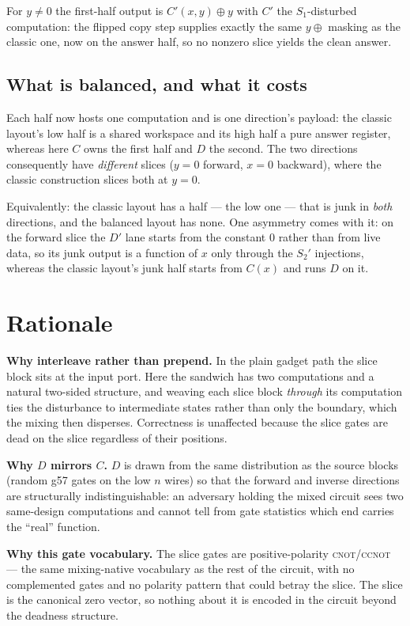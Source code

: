 \documentclass[11pt]{article}
\newcommand{\CNOT}{\textsc{cnot}}
\newcommand{\CCNOT}{\textsc{ccnot}}
\begin{document}
For $y \neq 0$ the first-half output is $C'(x,y) \oplus y$ with $C'$ the
$S_1$-disturbed computation: the flipped copy step supplies exactly the same
$y\oplus$ masking as the classic one, now on the answer half, so no nonzero
slice yields the clean answer.

\subsection{What is balanced, and what it costs}

Each half now hosts one computation and is one direction's payload: the
classic layout's low half is a shared workspace and its high half a pure
answer register, whereas here $C$ owns the first half and $D$ the second.
The two directions consequently have \emph{different} slices ($y=0$ forward,
$x=0$ backward), where the classic construction slices both at $y=0$.

Equivalently: the classic layout has a half --- the low one --- that is junk
in \emph{both} directions, and the balanced layout has none. One asymmetry
comes with it: on the forward slice the $D'$ lane starts from the constant $0$
rather than from live data, so its junk output is a function of $x$ only
through the $S_2'$ injections, whereas the classic layout's junk half starts
from $C(x)$ and runs $D$ on it.

\section{Rationale}

\textbf{Why interleave rather than prepend.} In the plain gadget path the
slice block sits at the input port. Here the sandwich has two computations and
a natural two-sided structure, and weaving each slice block \emph{through} its
computation ties the disturbance to intermediate states rather than only the
boundary, which the mixing then disperses. Correctness is unaffected because
the slice gates are dead on the slice regardless of their positions.

\textbf{Why $D$ mirrors $C$.} $D$ is drawn from the same distribution as the
source blocks (random g57 gates on the low $n$ wires) so that the forward and
inverse directions are structurally indistinguishable: an adversary holding
the mixed circuit sees two same-design computations and cannot tell from gate
statistics which end carries the ``real'' function.

\textbf{Why this gate vocabulary.} The slice gates are positive-polarity
\CNOT/\CCNOT{} --- the same mixing-native vocabulary as the rest of the
circuit, with no complemented gates and no polarity pattern that could betray
the slice. The slice is the canonical zero vector, so nothing about it is
encoded in the circuit beyond the deadness structure.
\end{document}
